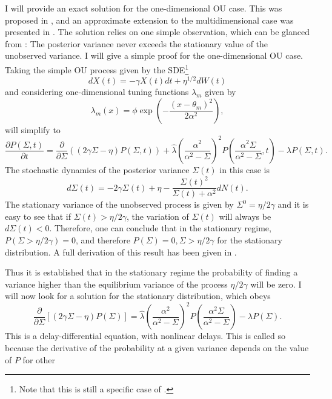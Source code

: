 I will provide an exact solution for the one-dimensional OU case. This was proposed in , and an approximate extension to the multidimensional case was presented in 
. The solution relies on one simple observation, which can be glanced from : The posterior variance never exceeds the stationary value of the unobserved 
variance. I will give a simple proof for the one-dimensional OU case. Taking the simple OU process
given by the SDE\footnote{Note that this is still a specific case of .}
\[
dX(t) = -\gamma X(t) dt + \eta^{1/2} dW(t)
\]
and considering one-dimensional tuning functions $\lambda_m$ given by
\[
\lambda_m(x) = \phi \exp\left(-\frac{(x-\theta_m)^2}{2\alpha^2}\right),
\]
 will simplify to
\begin{equation}
\frac{\partial P(\Sigma,t)}{\partial t} = \frac{\partial}{\partial \Sigma} \left((2\gamma \Sigma - \eta) P(\Sigma,t) \right) + \hat{\lambda} \left(\frac{\alpha^2}{\alpha^2-\Sigma} \right)^2 P\left(\frac{\alpha^2\Sigma}{\alpha^2-\Sigma},t\right) - \lambda P(\Sigma,t).
\end{equation}
The stochastic dynamics of the posterior variance $\Sigma(t)$ in this case is
\[
d\Sigma(t) = -2\gamma \Sigma(t) + \eta - \frac{\Sigma(t)^2}{\Sigma(t) + \alpha^2} dN(t).
\]
The stationary variance of the unobserved process is given by $\Sigma^0 = \eta/2\gamma$ and it is easy to see that if $\Sigma(t) > \eta/2\gamma$, the variation of
$\Sigma(t)$ will always be $d\Sigma(t)<0$.
Therefore, one can conclude that in the stationary regime, $P(\Sigma > \eta/2\gamma) = 0$, and therefore $P(\Sigma) = 0, \Sigma > \eta/2\gamma$ for the stationary distribution. A full 
derivation of this result has been given in .
\par
Thus it is established that in the stationary regime the probability of finding a variance higher than the equilibrium variance of the process $\eta/2\gamma$ will be zero.
I will now look for a solution for the stationary distribution, which obeys
\begin{equation}
\label{eq:stationary_sigma}
\frac{\partial}{\partial \Sigma} \left[\left(2\gamma\Sigma-\eta\right) P(\Sigma)\right] = \hat{\lambda} \left(\frac{\alpha^2}{\alpha^2-\Sigma} \right)^2 P\left(\frac{\alpha^2\Sigma}{\alpha^2-\Sigma}\right) - \lambda P(\Sigma).
\end{equation}
This is a delay-differential equation, with nonlinear delays. This is called so because the derivative of the probability at a given variance depends on the value of $P$ for other 
